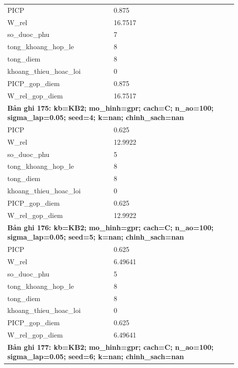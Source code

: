 \begin{longtable}{p{0.43\linewidth}p{0.50\linewidth}}
PICP & 0.875 \\
W\_\allowbreak rel & 16.7517 \\
so\_\allowbreak duoc\_\allowbreak phu & 7 \\
tong\_\allowbreak khoang\_\allowbreak hop\_\allowbreak le & 8 \\
tong\_\allowbreak diem & 8 \\
khoang\_\allowbreak thieu\_\allowbreak hoac\_\allowbreak loi & 0 \\
PICP\_\allowbreak gop\_\allowbreak diem & 0.875 \\
W\_\allowbreak rel\_\allowbreak gop\_\allowbreak diem & 16.7517 \\
\midrule
\multicolumn{2}{p{0.95\linewidth}}{\textbf{Bản ghi 175: kb=KB2; mo\_hinh=gpr; cach=C; n\_ao=100; sigma\_lap=0.05; seed=4; k=nan; chinh\_sach=nan}} \\
PICP & 0.625 \\
W\_\allowbreak rel & 12.9922 \\
so\_\allowbreak duoc\_\allowbreak phu & 5 \\
tong\_\allowbreak khoang\_\allowbreak hop\_\allowbreak le & 8 \\
tong\_\allowbreak diem & 8 \\
khoang\_\allowbreak thieu\_\allowbreak hoac\_\allowbreak loi & 0 \\
PICP\_\allowbreak gop\_\allowbreak diem & 0.625 \\
W\_\allowbreak rel\_\allowbreak gop\_\allowbreak diem & 12.9922 \\
\midrule
\multicolumn{2}{p{0.95\linewidth}}{\textbf{Bản ghi 176: kb=KB2; mo\_hinh=gpr; cach=C; n\_ao=100; sigma\_lap=0.05; seed=5; k=nan; chinh\_sach=nan}} \\
PICP & 0.625 \\
W\_\allowbreak rel & 6.49641 \\
so\_\allowbreak duoc\_\allowbreak phu & 5 \\
tong\_\allowbreak khoang\_\allowbreak hop\_\allowbreak le & 8 \\
tong\_\allowbreak diem & 8 \\
khoang\_\allowbreak thieu\_\allowbreak hoac\_\allowbreak loi & 0 \\
PICP\_\allowbreak gop\_\allowbreak diem & 0.625 \\
W\_\allowbreak rel\_\allowbreak gop\_\allowbreak diem & 6.49641 \\
\midrule
\multicolumn{2}{p{0.95\linewidth}}{\textbf{Bản ghi 177: kb=KB2; mo\_hinh=gpr; cach=C; n\_ao=100; sigma\_lap=0.05; seed=6; k=nan; chinh\_sach=nan}} \\

\end{longtable}
